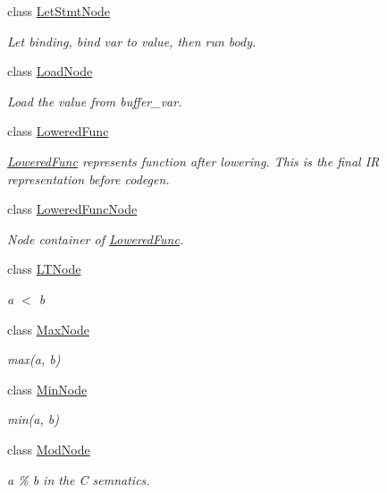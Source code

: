 \begin{DoxyCompactItemize}
class \hyperlink{classtvm_1_1tir_1_1LetStmtNode}{Let\+Stmt\+Node}
\begin{DoxyCompactList}\small\item\em Let binding, bind var to value, then run body. \end{DoxyCompactList}\item 
class \hyperlink{classtvm_1_1tir_1_1LoadNode}{Load\+Node}
\begin{DoxyCompactList}\small\item\em Load the value from buffer\+\_\+var. \end{DoxyCompactList}\item 
class \hyperlink{classtvm_1_1tir_1_1LoweredFunc}{Lowered\+Func}
\begin{DoxyCompactList}\small\item\em \hyperlink{classtvm_1_1tir_1_1LoweredFunc}{Lowered\+Func} represents function after lowering. This is the final IR representation before codegen. \end{DoxyCompactList}\item 
class \hyperlink{classtvm_1_1tir_1_1LoweredFuncNode}{Lowered\+Func\+Node}
\begin{DoxyCompactList}\small\item\em Node container of \hyperlink{classtvm_1_1tir_1_1LoweredFunc}{Lowered\+Func}. \end{DoxyCompactList}\item 
class \hyperlink{classtvm_1_1tir_1_1LTNode}{L\+T\+Node}
\begin{DoxyCompactList}\small\item\em a $<$ b \end{DoxyCompactList}\item 
class \hyperlink{classtvm_1_1tir_1_1MaxNode}{Max\+Node}
\begin{DoxyCompactList}\small\item\em max(a, b) \end{DoxyCompactList}\item 
class \hyperlink{classtvm_1_1tir_1_1MinNode}{Min\+Node}
\begin{DoxyCompactList}\small\item\em min(a, b) \end{DoxyCompactList}\item 
class \hyperlink{classtvm_1_1tir_1_1ModNode}{Mod\+Node}
\begin{DoxyCompactList}\small\item\em a \% b in the C semnatics. \end{DoxyCompactList}\item 

\end{DoxyCompactItemize}
